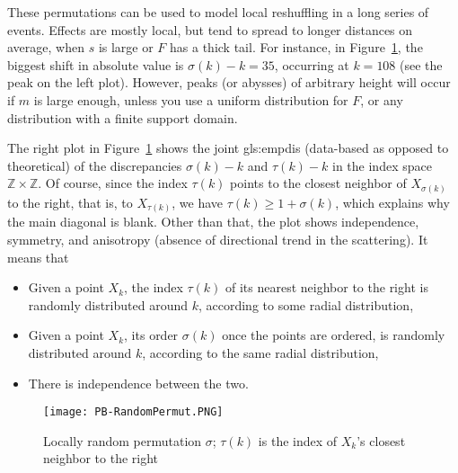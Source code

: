\documentclass[10pt]{article}
\begin{document}
These permutations can be used to model local reshuffling in a long series of events. Effects are mostly local, but tend to
spread to longer distances on average, when $s$ is large or $F$ has a thick tail. For instance, in Figure~\ref{fig:pbpermut}, the biggest shift in absolute value is $\sigma(k)-k =35$, occurring at $k=108$ (see the peak on the left plot). However, peaks (or abysses) of arbitrary height will occur if $m$ is large enough, unless you use a uniform distribution for $F$, or any distribution with a finite support domain.

The right plot in Figure~\ref{fig:pbpermut} shows the  joint \gls{gls:empdis} (data-based as opposed to theoretical) of the discrepancies  $\sigma(k) - k$ and $\tau(k)-k$ in the index space $\mathbb{Z}\times\mathbb{Z}$. Of course, since the index $\tau(k)$ points to the closest neighbor of  $X_{\sigma(k)}$ to the right, that is, to $X_{\tau(k)}$, we have $\tau(k)\geq 1+\sigma(k)$, which explains why the main diagonal is blank. Other than that, the plot shows independence, symmetry, and
\textcolor{index}{anisotropy} (absence of directional trend in the scattering). It means that
\begin{itemize}
\item Given a point $X_k$, the index $\tau(k)$ of its nearest neighbor to the right is randomly distributed around $k$, according to some radial distribution,
\item Given a point $X_k$, its order $\sigma(k)$ once the points are ordered,  is randomly distributed around $k$, according to the same radial distribution,
\item There is independence between the two.
\end{itemize}


\begin{figure}%
\centering
\texttt{[image: PB-RandomPermut.PNG]}
\caption{Locally random permutation $\sigma$; $\tau(k)$ is the index of $X_k$'s closest neighbor to the right}
\label{fig:pbpermut}
\end{figure}
\end{document}
